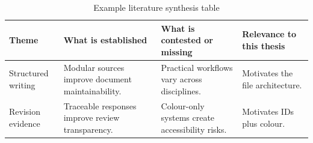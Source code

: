 \begin{table}[htbp]
  \centering
  \caption{Example literature synthesis table}
  \label{tab:literature-synthesis}
  \begin{tabularx}{\textwidth}{@{}>{\raggedright\arraybackslash}p{}YYY@{}}
    \toprule
    \textbf{Theme} & \textbf{What is established} & \textbf{What is contested or missing} & \textbf{Relevance to this thesis} \\
    \midrule
    Structured writing & Modular sources improve document maintainability. & Practical workflows vary across disciplines. & Motivates the file architecture. \\
    Revision evidence & Traceable responses improve review transparency. & Colour-only systems create accessibility risks. & Motivates IDs plus colour. \\
    \bottomrule
  \end{tabularx}
\end{table}
